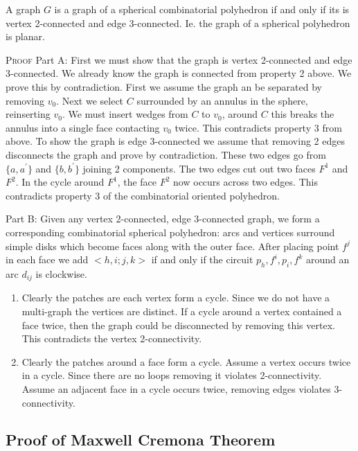 \documentclass[english]{article}
\begin{document}
A graph $G$ is a graph of a spherical combinatorial polyhedron if and only if its is vertex 2-connected and edge 3-connected. Ie. the graph of a spherical polyhedron is planar.

\textsc{Proof}
Part A: First we must show that the graph is vertex 2-connected and edge 3-connected. We already know the graph is connected from property 2 above. We prove this by contradiction. First we assume the graph an be separated by removing $v_0$. Next we select $C$ surrounded by an annulus in the sphere, reinserting $v_0$. We must insert wedges from $C$ to $v_0$, around $C$ this breaks the annulus into a single face contacting $v_0$ twice. This contradicts property 3 from above.
To show the graph is edge 3-connected we assume that removing 2 edges disconnects the graph and prove by contradiction. These two edges go from $\{a,a^{'}\}$ and $\{b, b^{'}\}$ joining 2 components. The two edges cut out two faces $F^1$ and $F^2$. In the cycle around $F^1$, the face $F^2$ now occurs across two edges. This contradicts property 3 of the combinatorial oriented polyhedron.

Part B:
Given any vertex 2-connected, edge 3-connected graph, we form a corresponding combinatorial spherical polyhedron: arcs and vertices surround simple disks which become faces along with the outer face. After placing point $f^j$ in each face we add $<h,i;j,k>$ if and only if the circuit $p_h, f^i,p_i,f^k$ around an arc $d_{ij}$ is clockwise. 

\begin{enumerate}
	\item Clearly the patches are each vertex form a cycle. Since we do not have a multi-graph the vertices are distinct. If a cycle around a vertex contained a face twice, then the graph could be disconnected by removing this vertex. This contradicts the vertex 2-connectivity. 
	\item Clearly the patches around a face form a cycle. Assume a vertex occurs twice in a cycle. Since there are no loops removing it violates 2-connectivity. Assume an adjacent face in a cycle occurs twice, removing edges violates 3-connectivity.
\end{enumerate}

\subsection{Proof of Maxwell Cremona Theorem}
\end{document}
